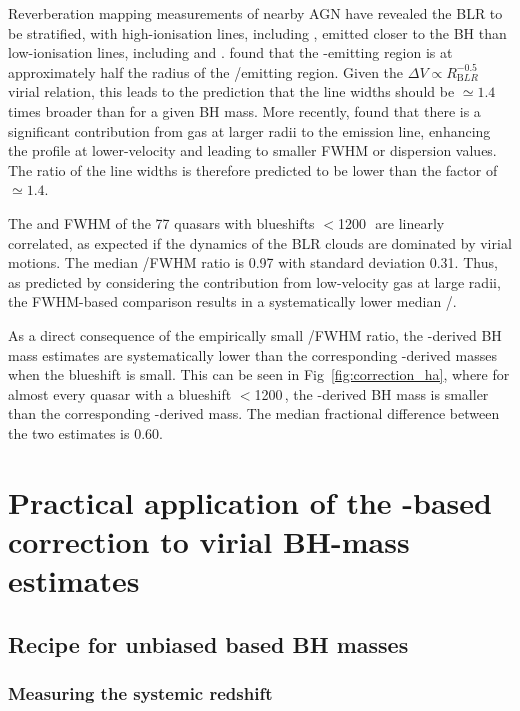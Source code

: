 Reverberation mapping measurements of nearby AGN have revealed the BLR to be stratified, with high-ionisation lines, including , emitted closer to the BH than low-ionisation lines, including \ha and \hb \citep[e.g.][]{onken02}.
\citet{vestergaard06} found that the -emitting region is at approximately half the radius of the \hbns/\ha emitting region.
Given the $\Delta V \propto R_{\mathrm BLR}^{-0.5}$ virial relation, this leads to the prediction that the  line widths should be $\simeq 1.4$ times broader than \ha for a given BH mass. 
More recently, \citet{denney12} found that there is a significant contribution from gas at larger radii to the  emission line, enhancing the profile at lower-velocity and leading to smaller FWHM or dispersion values. 
The ratio of the line widths is therefore predicted to be lower than the factor of $\simeq 1.4$. 

The \ha and  FWHM of the 77 quasars with  blueshifts $<$1200\,\kms\, are linearly correlated, as expected if the dynamics of the BLR clouds are dominated by virial motions. 
The median /\ha FWHM ratio is 0.97 with standard deviation 0.31. 
Thus, as predicted by considering the contribution from low-velocity gas at large radii, the FWHM-based comparison results in a systematically lower median /\hans.

As a direct consequence of the empirically small /\ha FWHM ratio, the -derived BH mass estimates are systematically lower than the corresponding \hans-derived masses when the blueshift is small.
This can be seen in Fig~\ref{fig:correction_ha}, where for almost every quasar with a  blueshift $<$1200\,\kms, the -derived BH mass is smaller than the corresponding \hans-derived mass.
The median fractional difference between the two estimates is 0.60.  

\section{Practical application of the -based correction to virial BH-mass estimates}

\subsection{Recipe for unbiased  based BH masses}
\label{sec:ch3-recipe}

\subsubsection{Measuring the systemic redshift}


